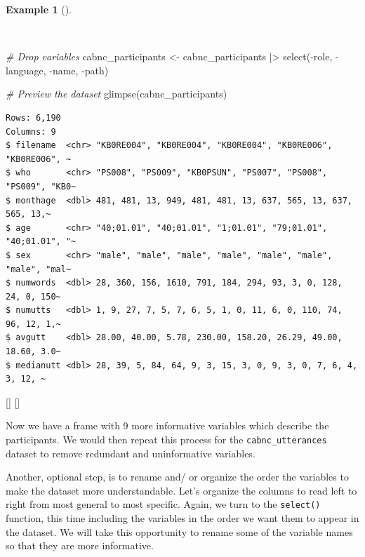 \documentclass[
  letterpaper,
  krantz1]{latex/krantz-mod}
\newenvironment{Shaded}{\begin{snugshade}}{\end{snugshade}}
\newcommand{\CommentTok}[1]{\textcolor[rgb]{0.00,0.00,0.00}{\textit{#1}}}
\newcommand{\FunctionTok}[1]{\textcolor[rgb]{0.00,0.00,0.00}{#1}}
\newcommand{\NormalTok}[1]{\textcolor[rgb]{0.00,0.00,0.00}{#1}}
\newcommand{\OtherTok}[1]{\textcolor[rgb]{0.00,0.00,0.00}{#1}}
\newcommand{\SpecialCharTok}[1]{\textcolor[rgb]{0.00,0.00,0.00}{#1}}
\newcommand{\cindex}[1]{%
  \StrSubstitute{#1}{_}{\_}[\temp]%
  \index{\temp}%
}
\theoremstyle{definition}
\theoremstyle{definition}
\newtheorem{example}{Example}[chapter]
\theoremstyle{remark}
\begin{document}
\begin{example}[]\protect\hypertarget{exm-curate-cabnc-drop-vars}{}\label{exm-curate-cabnc-drop-vars}

~

\begin{Shaded}
\begin{Highlighting}[numbers=left,,]
\CommentTok{\# Drop variables}
\NormalTok{cabnc\_participants }\OtherTok{\textless{}{-}}
\NormalTok{  cabnc\_participants }\SpecialCharTok{|\textgreater{}}
  \FunctionTok{select}\NormalTok{(}\SpecialCharTok{{-}}\NormalTok{role, }\SpecialCharTok{{-}}\NormalTok{language, }\SpecialCharTok{{-}}\NormalTok{name, }\SpecialCharTok{{-}}\NormalTok{path)}

\CommentTok{\# Preview the dataset}
\FunctionTok{glimpse}\NormalTok{(cabnc\_participants)}
\end{Highlighting}
\end{Shaded}

\begin{verbatim}
Rows: 6,190
Columns: 9
$ filename  <chr> "KB0RE004", "KB0RE004", "KB0RE004", "KB0RE006", "KB0RE006", ~
$ who       <chr> "PS008", "PS009", "KB0PSUN", "PS007", "PS008", "PS009", "KB0~
$ monthage  <dbl> 481, 481, 13, 949, 481, 481, 13, 637, 565, 13, 637, 565, 13,~
$ age       <chr> "40;01.01", "40;01.01", "1;01.01", "79;01.01", "40;01.01", "~
$ sex       <chr> "male", "male", "male", "male", "male", "male", "male", "mal~
$ numwords  <dbl> 28, 360, 156, 1610, 791, 184, 294, 93, 3, 0, 128, 24, 0, 150~
$ numutts   <dbl> 1, 9, 27, 7, 5, 7, 6, 5, 1, 0, 11, 6, 0, 110, 74, 96, 12, 1,~
$ avgutt    <dbl> 28.00, 40.00, 5.78, 230.00, 158.20, 26.29, 49.00, 18.60, 3.0~
$ medianutt <dbl> 28, 39, 5, 84, 64, 9, 3, 15, 3, 0, 9, 3, 0, 7, 6, 4, 3, 12, ~
\end{verbatim}

\cindex{select()}\cindex{glimpse()}

\end{example}

Now we have a frame with 9 more informative variables which describe the
participants. We would then repeat this process for the
\texttt{cabnc\_utterances} dataset to remove redundant and uninformative
variables.

Another, optional step, is to rename and/ or organize the order the
variables to make the dataset more understandable. Let's organize the
columns to read left to right from most general to most specific. Again,
we turn to the \texttt{select()} function, this time including the
variables in the order we want them to appear in the dataset. We will
take this opportunity to rename some of the variable names so that they
are more informative.
\end{document}
